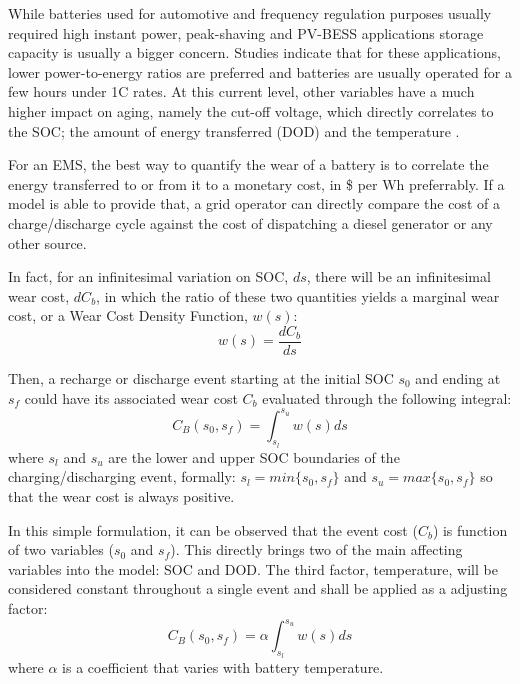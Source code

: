 \documentclass{ieeeaccess}
\begin{document}
    While batteries used for automotive and frequency regulation purposes usually required high instant power, peak-shaving and \ac{PV}-\ac{BESS} applications storage capacity is usually a bigger concern. Studies \cite{hesse2017lithium, sufyan2019optimal, asano2007methodology} indicate that for these applications, lower power-to-energy ratios are preferred and batteries are usually operated for a few hours under 1C rates. At this current level, other variables have a much higher impact on aging, namely the cut-off voltage, which directly correlates to the \ac{SOC}; the amount of energy transferred (\ac{DOD}) and the temperature \cite{HAN2014}.
    
    For an \ac{EMS}, the best way to quantify the wear of a battery is to correlate the energy transferred to or from it to a monetary cost, in \$ per Wh preferrably. If a model is able to provide that, a grid operator can directly compare the cost of a charge/discharge cycle against the cost of dispatching a diesel generator or any other source.
    
    In fact, for an infinitesimal variation on \ac{SOC}, $ds$, there will be an infinitesimal wear cost, $dC_b$, in which the ratio of these two quantities yields a marginal wear cost, or a Wear Cost Density Function, $w(s)$:
	$$ w(s) = \frac{dC_b}{ds} $$
    
    Then, a recharge or discharge event starting at the initial \ac{SOC} $s_{0}$ and ending at $s_{f}$ could have its associated wear cost $C_{b}$ evaluated through the following integral:
    $$ C_{B}(s_{0}, s_{f}) = \int_{s_{l}}^{s_{u}}w(s)ds $$
    where $s_{l}$ and $s_{u}$ are the lower and upper \ac{SOC} boundaries of the charging/discharging event, formally: $s_{l} = min\{s_{0}, s_{f}\}$ and $s_{u} = max\{s_{0}, s_{f}\}$ so that the wear cost is always positive.
    
    In this simple formulation, it can be observed that the event cost ($C_b$) is function of two variables ($s_0$ and $s_f$). This directly brings two of the main affecting variables into the model: \ac{SOC} and \ac{DOD}. The third factor, temperature, will be considered constant throughout a single event and shall be applied as a adjusting factor:
    \begin{equation}
    	C_{B}(s_{0}, s_{f}) = \alpha \int_{s_{l}}^{s_{u}}w(s)ds
    	\label{eq:Cb(s0,sf)}
    \end{equation}
	where $\alpha$ is a coefficient that varies with battery temperature.
\end{document}
